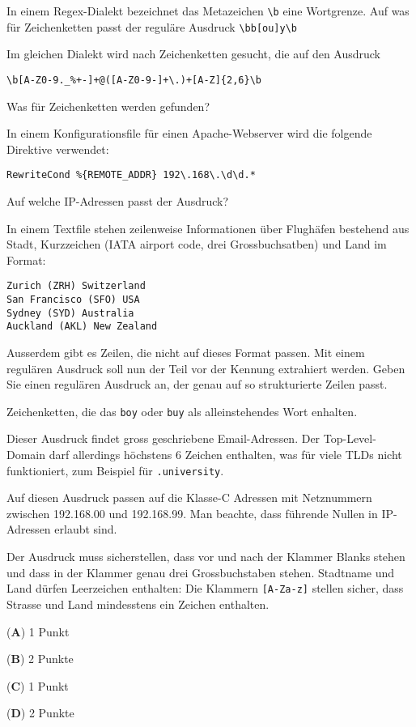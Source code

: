 \begin{teilaufgaben}
\item
In einem Regex-Dialekt bezeichnet das Metazeichen \texttt{\textbackslash{}b}
eine Wortgrenze.
Auf was für Zeichenketten passt der reguläre Ausdruck
\texttt{\textbackslash{}bb[ou]y\textbackslash{}b}
\item
Im gleichen Dialekt wird nach Zeichenketten gesucht, die auf den Ausdruck
\begin{verbatim}
\b[A-Z0-9._%+-]+@([A-Z0-9-]+\.)+[A-Z]{2,6}\b
\end{verbatim}
Was für Zeichenketten werden gefunden?
\item
In einem Konfigurationsfile für einen Apache-Webserver wird die folgende
Direktive verwendet:
\begin{verbatim}
RewriteCond %{REMOTE_ADDR} 192\.168\.\d\d.*
\end{verbatim}
Auf welche IP-Adressen passt der Ausdruck?
\item
In einem Textfile stehen zeilenweise Informationen über Flughäfen bestehend
aus Stadt, Kurzzeichen (IATA airport code, drei Grossbuchsatben) und Land
im Format:
\begin{verbatim}
Zurich (ZRH) Switzerland
San Francisco (SFO) USA
Sydney (SYD) Australia
Auckland (AKL) New Zealand
\end{verbatim}
Ausserdem gibt es Zeilen, die nicht auf dieses Format passen.
Mit einem regulären Ausdruck soll nun der Teil vor der Kennung extrahiert
werden. 
Geben Sie einen regulären Ausdruck an, der genau auf so strukturierte
Zeilen passt.
\end{teilaufgaben}


\begin{loesung}
\begin{teilaufgaben}
\item
Zeichenketten, die das \texttt{boy} oder \texttt{buy} als
alleinstehendes Wort enhalten.
\item
Dieser Ausdruck findet gross geschriebene Email-Adressen.
Der Top-Level-Domain darf allerdings höchstens 6 Zeichen enthalten,
was für viele TLDs nicht funktioniert, zum Beispiel für \texttt{.university}.
\item
Auf diesen Ausdruck passen auf die Klasse-C Adressen mit Netznummern
zwischen 192.168.00 und 192.168.99.
Man beachte, dass führende Nullen in IP-Adressen erlaubt sind.
\item
Der Ausdruck muss sicherstellen, dass vor und nach der Klammer Blanks stehen
und dass in der Klammer genau drei Grossbuchstaben stehen.
Stadtname und Land dürfen Leerzeichen enthalten:
Die Klammern \texttt{[A-Za-z]} stellen sicher, dass Strasse und Land
mindesstens ein Zeichen enthalten.
\end{teilaufgaben}
\end{loesung}

\begin{bewertung}
\begin{teilaufgaben}
\item ({\bf A}) 1 Punkt
\item ({\bf B}) 2 Punkte
\item ({\bf C}) 1 Punkt
\item ({\bf D}) 2 Punkte
\end{teilaufgaben}
\end{bewertung}


